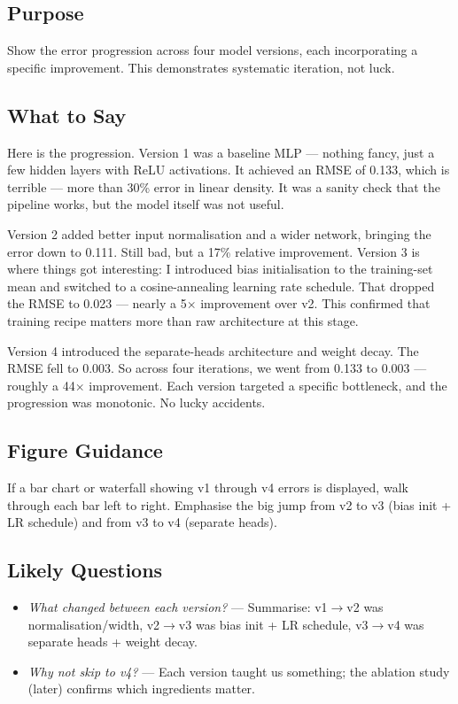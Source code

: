 \documentclass[12pt,a4paper]{article}
\begin{document}
\subsection*{Purpose}
Show the error progression across four model versions, each
incorporating a specific improvement. This demonstrates systematic
iteration, not luck.

\subsection*{What to Say}

Here is the progression. Version 1 was a baseline MLP --- nothing
fancy, just a few hidden layers with ReLU activations. It achieved
an RMSE of 0.133, which is terrible --- more than 30\% error in
linear density. It was a sanity check that the pipeline works, but
the model itself was not useful.

Version 2 added better input normalisation and a wider network,
bringing the error down to 0.111. Still bad, but a 17\% relative
improvement. Version 3 is where things got interesting: I introduced
bias initialisation to the training-set mean and switched to a
cosine-annealing learning rate schedule. That dropped the RMSE to
0.023 --- nearly a 5$\times$ improvement over v2. This confirmed
that training recipe matters more than raw architecture at this stage.

Version 4 introduced the separate-heads architecture and weight decay.
The RMSE fell to 0.003. So across four iterations, we went from 0.133
to 0.003 --- roughly a 44$\times$ improvement. Each version targeted
a specific bottleneck, and the progression was monotonic. No lucky
accidents.

\subsection*{Figure Guidance}
If a bar chart or waterfall showing v1 through v4 errors is
displayed, walk through each bar left to right. Emphasise the big
jump from v2 to v3 (bias init + LR schedule) and from v3 to v4
(separate heads).

\subsection*{Likely Questions}
\begin{itemize}
  \item \emph{What changed between each version?}
    --- Summarise: v1$\to$v2 was normalisation/width, v2$\to$v3 was
    bias init + LR schedule, v3$\to$v4 was separate heads + weight
    decay.
  \item \emph{Why not skip to v4?}
    --- Each version taught us something; the ablation study (later)
    confirms which ingredients matter.
\end{itemize}
\end{document}
